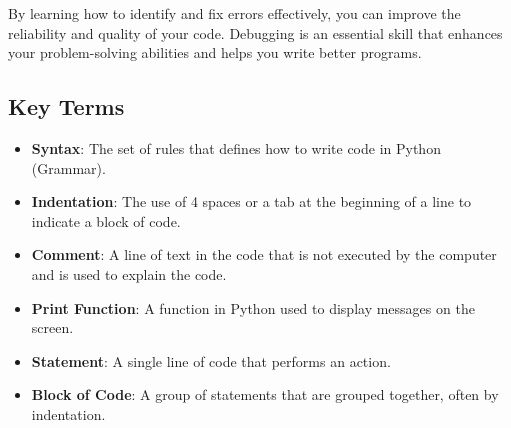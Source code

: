 By learning how to identify and fix errors effectively, you can improve the reliability and quality of your code. Debugging is an essential skill that enhances your problem-solving abilities and helps you write better programs.

\subsection*{Key Terms}
\begin{itemize}
    \item \textbf{Syntax}: The set of rules that defines how to write code in Python (Grammar).
    \item \textbf{Indentation}: The use of 4 spaces or a tab at the beginning of a line to indicate a block of code.
    \item \textbf{Comment}: A line of text in the code that is not executed by the computer and is used to explain the code.
    \item \textbf{Print Function}: A function in Python used to display messages on the screen.
    \item \textbf{Statement}: A single line of code that performs an action.
    \item \textbf{Block of Code}: A group of statements that are grouped together, often by indentation.
\end{itemize}